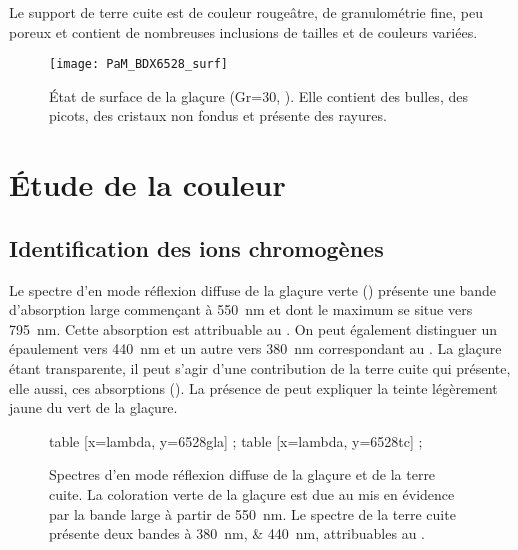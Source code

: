 Le support de terre cuite est de couleur rougeâtre, de granulométrie 
fine, peu poreux et contient de nombreuses inclusions de tailles et 
de couleurs variées.

\begin{figure}[htb]
  \texttt{[image: PaM\_BDX6528\_surf]}
  \caption[\ -- État de surface de la glaçure]
          {\legendeA 
           État de surface de la glaçure (Gr=30, ). Elle contient des 
           bulles, des picots, des cristaux non fondus et présente 
           des rayures.}
  \label{surf:6528}
\end{figure}


\section{Étude de la couleur}

\subsection{Identification des ions chromogènes}
Le spectre d'\AO en mode réflexion diffuse de la glaçure verte () présente une bande d'absorption large commençant à \SI{550}{nm} et dont le maximum se situe vers \SI{795}{nm}. Cette absorption est attribuable au  \autocite{Lajarte_1979}. On peut également distinguer un épaulement vers \SI{440}{nm} et un autre vers \SI{380}{nm} correspondant au . La glaçure étant transparente, il peut s'agir d'une contribution de la terre cuite qui présente, elle aussi, ces absorptions (). La présence de  peut expliquer la teinte légèrement jaune du vert de la glaçure.

\begin{figure}[htb]
  \begin{plotspectre}
       table [x=lambda, y=6528gla] {\gladata} ;
       table [x=lambda, y=6528tc] {\tcdata} ;
  \end{plotspectre}
  \caption[\ -- Spectres d'\AO en mode réflexion diffuse de la glaçure et de la terre cuite]
          {\legendeA
           Spectres d'\AO en mode réflexion diffuse de la glaçure et de la terre cuite. La coloration verte de la glaçure est due au  mis en évidence par la bande large à partir de \SI{550}{\nm}. Le spectre de la terre cuite présente deux bandes à \SIlist{380;440}{\nm}, attribuables au  \autocite{Lajarte_1979}.}
  \label{spectre:6528}
\end{figure}

